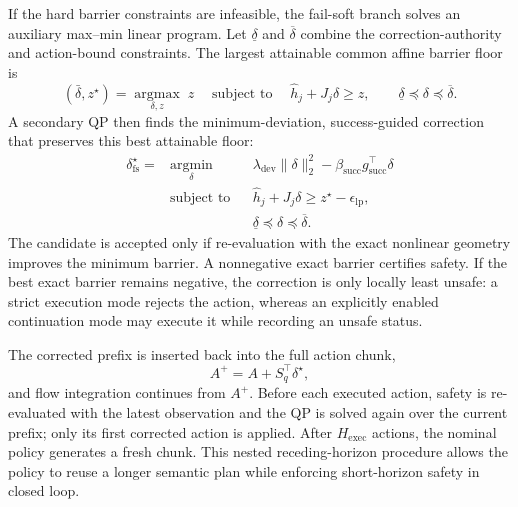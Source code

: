 If the hard barrier constraints are infeasible, the fail-soft branch solves an auxiliary max--min linear program. Let $\underline{\delta}$ and $\overline{\delta}$ combine the correction-authority and action-bound constraints. The largest attainable common affine barrier floor is
\begin{equation}
    (\bar{\delta},z^{\star})
    =\underset{\delta,z}{\operatorname{argmax}}\;z
    \quad\operatorname{subject\ to}\quad
    \widehat{h}_j+J_j\delta\geq z,
    \qquad
    \underline{\delta}\preceq\delta\preceq\overline{\delta}.
\end{equation}
A secondary QP then finds the minimum-deviation, success-guided correction that preserves this best attainable floor:
\begin{equation}
    \begin{aligned}
    \delta_{\mathrm{fs}}^{\star}
    ={}&\underset{\delta}{\operatorname{argmin}}
        &&\lambda_{\mathrm{dev}}\|\delta\|_2^2
        -\beta_{\mathrm{succ}}g_{\mathrm{succ}}^{\top}\delta\\
    &\operatorname{subject\ to}
        &&\widehat{h}_j+J_j\delta\geq z^{\star}-\epsilon_{\mathrm{lp}},\\
    &&&\underline{\delta}\preceq\delta\preceq\overline{\delta}.
    \end{aligned}
\end{equation}
The candidate is accepted only if re-evaluation with the exact nonlinear geometry improves the minimum barrier. A nonnegative exact barrier certifies safety. If the best exact barrier remains negative, the correction is only locally least unsafe: a strict execution mode rejects the action, whereas an explicitly enabled continuation mode may execute it while recording an unsafe status.

The corrected prefix is inserted back into the full action chunk,
\begin{equation}
    A^{+}=A+S_q^{\top}\delta^{\star},
\end{equation}
and flow integration continues from $A^{+}$. Before each executed action, safety is re-evaluated with the latest observation and the QP is solved again over the current prefix; only its first corrected action is applied. After $H_{\mathrm{exec}}$ actions, the nominal policy generates a fresh chunk. This nested receding-horizon procedure allows the policy to reuse a longer semantic plan while enforcing short-horizon safety in closed loop.
